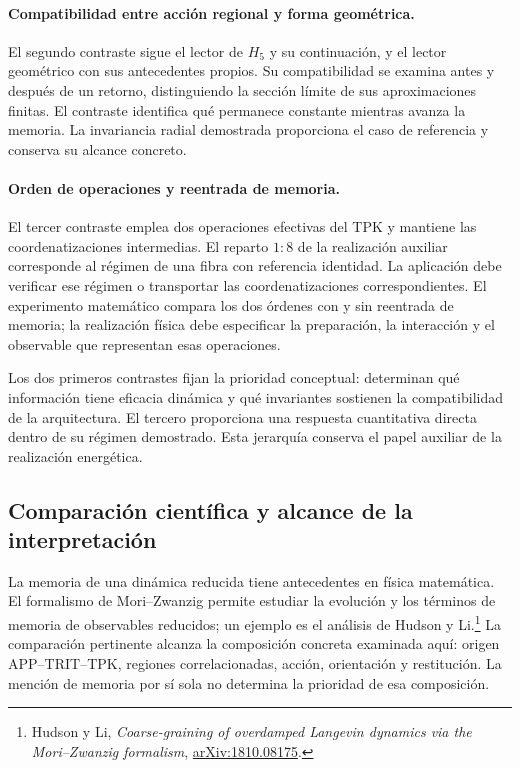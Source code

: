 \paragraph{Compatibilidad entre acción regional y forma geométrica.}
El segundo contraste sigue el lector de $H_5$ y su continuación, y
el lector geométrico con sus antecedentes propios. Su compatibilidad
se examina antes y después de un retorno, distinguiendo la sección
límite de sus aproximaciones finitas. El contraste identifica qué
permanece constante mientras avanza la memoria. La invariancia radial
demostrada proporciona el caso de referencia y conserva su alcance
concreto.

\paragraph{Orden de operaciones y reentrada de memoria.}
El tercer contraste emplea dos operaciones efectivas del TPK y
mantiene las coordenatizaciones intermedias. El reparto $1:8$ de la realización
auxiliar corresponde al régimen de una fibra con referencia identidad.
La aplicación debe verificar ese régimen o transportar las coordenatizaciones
correspondientes. El experimento matemático compara los dos órdenes
con y sin reentrada de memoria; la realización física debe especificar
la preparación, la interacción y el observable que representan esas
operaciones.

Los dos primeros contrastes fijan la prioridad conceptual: determinan
qué información tiene eficacia dinámica y qué invariantes sostienen
la compatibilidad de la arquitectura. El tercero proporciona una
respuesta cuantitativa directa dentro de su régimen demostrado.
Esta jerarquía conserva el papel auxiliar de la realización energética.

\subsection{Comparación científica y alcance de la interpretación}
\label{md:lectin:comparacion}

La memoria de una dinámica reducida tiene antecedentes en física
matemática. El formalismo de Mori--Zwanzig permite estudiar la
evolución y los términos de memoria de observables reducidos; un
ejemplo es el análisis de Hudson y Li.\footnote{Hudson y Li,
\emph{Coarse-graining of overdamped Langevin dynamics via the
Mori--Zwanzig formalism},
\href{https://arxiv.org/abs/1810.08175}{arXiv:1810.08175}.}
La comparación pertinente alcanza la composición concreta examinada
aquí: origen APP--TRIT--TPK, regiones correlacionadas, acción,
orientación y restitución. La mención de memoria por sí sola no
determina la prioridad de esa composición.

